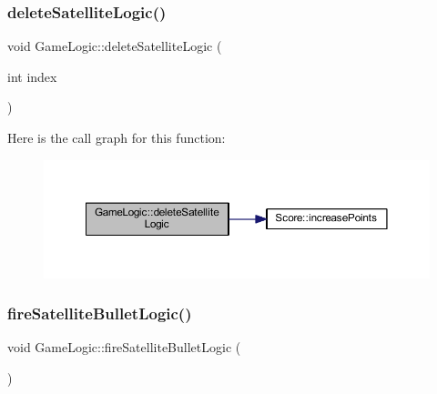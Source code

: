 \mbox{\label{class_game_logic_a3954ee824ac3acc8753f61f97d41ce89}} 
\subsubsection{\texorpdfstring{delete\+Satellite\+Logic()}{deleteSatelliteLogic()}}
{\footnotesize\ttfamily void Game\+Logic\+::delete\+Satellite\+Logic (\begin{DoxyParamCaption}\item[{int}]{index }\end{DoxyParamCaption})}

Here is the call graph for this function\+:
\nopagebreak
\begin{figure}[H]
\begin{center}
\leavevmode
\includegraphics[width=350pt]{class_game_logic_a3954ee824ac3acc8753f61f97d41ce89_cgraph}
\end{center}
\end{figure}
\mbox{\label{class_game_logic_ab84e34d803932a798b76f1c3b8a4af83}} 
\subsubsection{\texorpdfstring{fire\+Satellite\+Bullet\+Logic()}{fireSatelliteBulletLogic()}}
{\footnotesize\ttfamily void Game\+Logic\+::fire\+Satellite\+Bullet\+Logic (\begin{DoxyParamCaption}{ }\end{DoxyParamCaption})}

